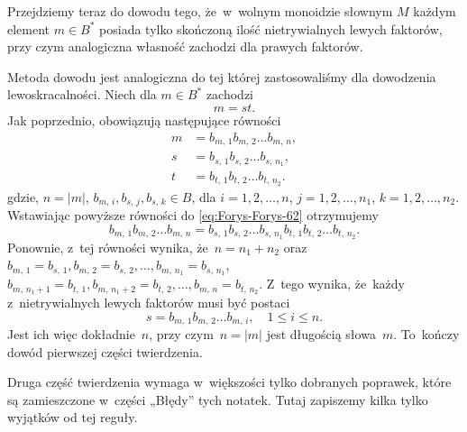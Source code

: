 \documentclass[a4paper,11pt]{article}
\begin{document}
Przejdziemy teraz do dowodu tego, że~w~wolnym monoidzie słownym $M$
każdym element $m \in B^{ * }$ posiada tylko skończoną ilość
nietrywialnych lewych faktorów, przy czym analogiczna własność
zachodzi dla prawych faktorów.

Metoda dowodu jest analogiczna do tej której zastosowaliśmy dla
dowodzenia lewoskracalności. Niech dla $m \in B^{ * }$ zachodzi
\begin{equation}
  \label{eq:Forys-Forys-62}
  m = s t.
\end{equation}
Jak poprzednio, obowiązują następujące równości
\begin{subequations}
  \begin{align}
    \label{eq:Forys-Forys-63-A}
    m &= b_{ m,\, 1 } b_{ m,\, 2 } \ldots b_{ m,\, n }, \\
    \label{eq:Forys-Forys-63-B}
    s &= b_{ s,\, 1 } b_{ s,\, 2 } \ldots b_{ s,\, n_{ 1 } }, \\
    \label{eq:Forys-Forys-63-C}
    t &= b_{ t,\, 1 } b_{ t,\, 2 } \ldots b_{ t,\, n_{ 2 } }.
  \end{align}
\end{subequations}
gdzie, $n = | m |$, $b_{ m,\, i }, b_{ s,\, j }, b_{ s,\, k } \in B$,
dla $i = 1, 2, \ldots, n$, $j = 1, 2, \ldots, n_{ 1 }$,
$k = 1, 2, \ldots, n_{ 2 }$. Wstawiając powyższe równości do
\eqref{eq:Forys-Forys-62} otrzymujemy
\begin{equation}
  \label{eq:Forys-Forys-64}
  b_{ m,\, 1 } b_{ m,\, 2 } \ldots b_{ m,\, n } =
  b_{ s,\, 1 } b_{ s,\, 2 } \ldots b_{ s,\, n_{ 1 } }
  b_{ t,\, 1 } b_{ t,\, 2 } \ldots b_{ t,\, n_{ 2 } }.
\end{equation}
Ponownie, z~tej równości wynika, że~$n = n_{ 1 } + n_{ 2 }$ oraz
$b_{ m,\, 1 } = b_{ s,\, 1 }, b_{ m,\, 2 } = b_{ s,\, 2 }, \ldots, b_{ m,\,
  n_{ 1 } } = b_{ s,\, n_{ 1 } }$,
$b_{ m,\, n_{ 1 } + 1 } = b_{ t,\, 1 }, b_{ m,\, n_{ 1 } + 2 } = b_{
  t,\, 2 }, \ldots, b_{ m,\, n } = b_{ t,\, n_{ 2 } }$. Z~tego wynika,
że~każdy z~nietrywialnych lewych faktorów musi być postaci
\begin{equation}
  \label{eq:Forys-Forys-65}
  s = b_{ m,\, 1 } b_{ m,\, 2 } \ldots b_{ m,\, i }, \quad
  1 \leq i \leq n.
\end{equation}
Jest ich więc dokładnie~$n$, przy czym~$n = | m |$ jest długością
słowa~$m$. To~kończy dowód pierwszej części twierdzenia.

Druga część twierdzenia wymaga w~większości tylko dobranych poprawek,
które są zamieszczone w~części „Błędy” tych notatek. Tutaj zapiszemy
kilka tylko wyjątków od tej reguły.
\end{document}
